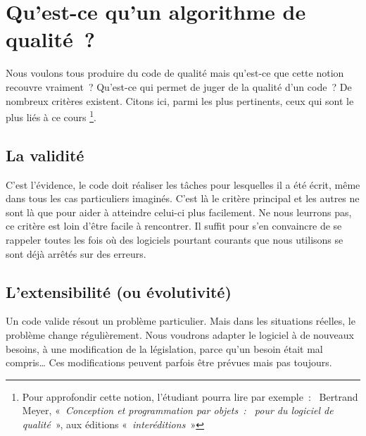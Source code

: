 

\section{Qu’est-ce qu’un algorithme de qualité~?}

	Nous voulons tous produire du code de qualité 
	mais qu’est-ce que cette notion recouvre vraiment~?
	Qu’est-ce qui permet de juger de la qualité d’un code~? 
	De nombreux critères existent. 
	Citons ici, parmi les plus pertinents, 
	ceux qui sont le plus liés à ce cours%
	\footnote{%
		Pour approfondir cette notion,
		l’étudiant pourra lire par exemple~:~
		Bertrand Meyer,
		«~\textit{Conception et programmation par objets~:~
		pour du logiciel de qualité}~», 
		aux éditions «\textit{~interéditions~}»
	}.

	\subsection{La validité}
	
		C’est l’évidence, le code doit réaliser les tâches 
		pour lesquelles il a été écrit, 
		même dans tous les cas particuliers imaginés. 
		C’est là le critère principal et les autres ne sont là 
		que pour aider à atteindre celui-ci plus facilement. 
		Ne nous leurrons pas, 
		ce critère est loin d’être facile à rencontrer. 
		Il suffit pour s’en convaincre de se rappeler toutes les fois 
		où des logiciels pourtant courants que nous utilisons 
		se sont déjà arrêtés sur des erreurs.
	
	\subsection{L’extensibilité (ou évolutivité)}
	
		Un code valide résout un problème particulier. 
		Mais dans les situations réelles, 
		le problème change régulièrement. 
		Nous voudrons adapter le logiciel à de nouveaux besoins, 
		à une modification de la législation,
		parce qu’un besoin était mal compris\dots{}
		Ces modifications peuvent parfois être prévues mais pas toujours.
	

